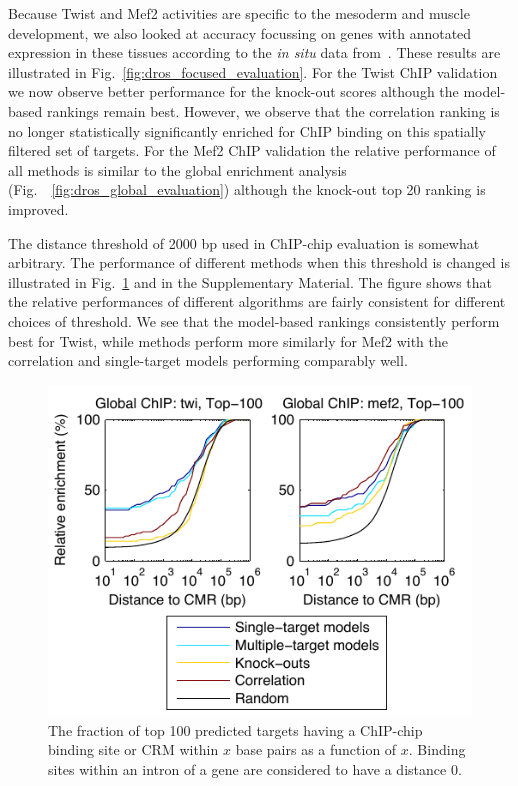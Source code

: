 \documentclass{pnastwo}
\begin{document}
\begin{article}
Because Twist and Mef2 activities are specific to the mesoderm and
muscle development, we also looked at accuracy focussing on genes
with annotated expression in these tissues according to the
\emph{in situ} data from~\cite{Tomancak2002}. These results are illustrated in Fig.~\ref{fig:dros_focused_evaluation}. For the Twist ChIP validation we now observe better performance for the knock-out scores although the model-based rankings remain best. However, we observe that the correlation ranking is no longer statistically significantly enriched for ChIP binding on this spatially filtered set of targets. For the Mef2 ChIP validation the relative performance of all methods is similar to the global enrichment analysis (Fig.~~\ref{fig:dros_global_evaluation}) although the knock-out top 20 ranking is improved.


The distance threshold of 2000 bp used in ChIP-chip evaluation is
somewhat arbitrary.  The performance of different methods when this
threshold is changed is illustrated in
Fig.~\ref{fig:dros_binding_site_distances} and in the Supplementary
Material.  The figure shows that the relative performances of
different algorithms are fairly consistent for different choices of threshold. 
We see that the model-based rankings consistently perform best for Twist, while 
methods perform more similarly for Mef2 with the correlation and single-target models 
performing comparably well.

\begin{figure}[tb]
  \centering
  \includegraphics{dros_binding_site_distances}
  \caption{The fraction of top 100 predicted targets having a ChIP-chip
    binding site or CRM within $x$ base pairs as a function of $x$.
    Binding sites within an intron of a gene are considered to
    have a distance 0.
    \label{fig:dros_binding_site_distances}}
\end{figure}


\end{article}
\end{document}
